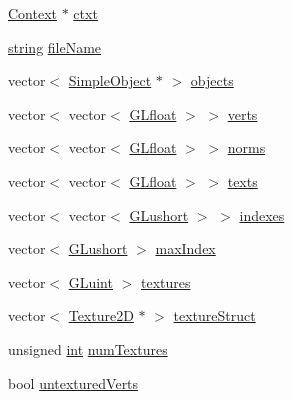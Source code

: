 \begin{DoxyCompactItemize}
\item 
\hyperlink{class_context}{Context} $\ast$ \hyperlink{classassimp_mesh_a02d771465184fd290ac9cc4b38b32828}{ctxt}
\item 
\hyperlink{_g_l_e_w_2glew_8h_a06b88fc81ad0b30d1512e9609e3d7c82}{string} \hyperlink{classassimp_mesh_ab3e634962612b237a956fd8128f70c84}{file\-Name}
\item 
vector$<$ \hyperlink{class_simple_object}{Simple\-Object} $\ast$ $>$ \hyperlink{classassimp_mesh_a130a8db8b84bdb7b83599034a5543763}{objects}
\item 
vector$<$ vector$<$ \hyperlink{_g_l_e_w_2glew_8h_a4a966015c733cb5fe2733de64a62a3a5}{G\-Lfloat} $>$ $>$ \hyperlink{classassimp_mesh_aafe85632fb36e3b7a55f5e49023feaa1}{verts}
\item 
vector$<$ vector$<$ \hyperlink{_g_l_e_w_2glew_8h_a4a966015c733cb5fe2733de64a62a3a5}{G\-Lfloat} $>$ $>$ \hyperlink{classassimp_mesh_a71635c933787e2acfce8bfdfe60fb958}{norms}
\item 
vector$<$ vector$<$ \hyperlink{_g_l_e_w_2glew_8h_a4a966015c733cb5fe2733de64a62a3a5}{G\-Lfloat} $>$ $>$ \hyperlink{classassimp_mesh_af73735a4a7b8b692b658af1e4f292e6d}{texts}
\item 
vector$<$ vector$<$ \hyperlink{_g_l_e_w_2glew_8h_ac995a558f6571eb5f98b7a6d2b2a4468}{G\-Lushort} $>$ $>$ \hyperlink{classassimp_mesh_a488c709de58bc05a6c1748a379d29109}{indexes}
\item 
vector$<$ \hyperlink{_g_l_e_w_2glew_8h_ac995a558f6571eb5f98b7a6d2b2a4468}{G\-Lushort} $>$ \hyperlink{classassimp_mesh_a103119ca657355e47e36a88802fa485a}{max\-Index}
\item 
vector$<$ \hyperlink{_g_l_e_w_2glew_8h_a68c4714e43d8e827d80759f9cb864f3c}{G\-Luint} $>$ \hyperlink{classassimp_mesh_a5b64a6b1ffa93791b51bc0205d7f8dfa}{textures}
\item 
vector$<$ \hyperlink{class_texture2_d}{Texture2\-D} $\ast$ $>$ \hyperlink{classassimp_mesh_ad7c6c414b638d448d4f4ee5ce1e47fae}{texture\-Struct}
\item 
unsigned \hyperlink{_s_d_l__thread_8h_a6a64f9be4433e4de6e2f2f548cf3c08e}{int} \hyperlink{classassimp_mesh_a5bca3d425fef3b8cef719bb9e0384d8a}{num\-Textures}
\item 
bool \hyperlink{classassimp_mesh_a17eccca561b80ff903e4845aaa29b6cf}{untextured\-Verts}
\end{DoxyCompactItemize}


